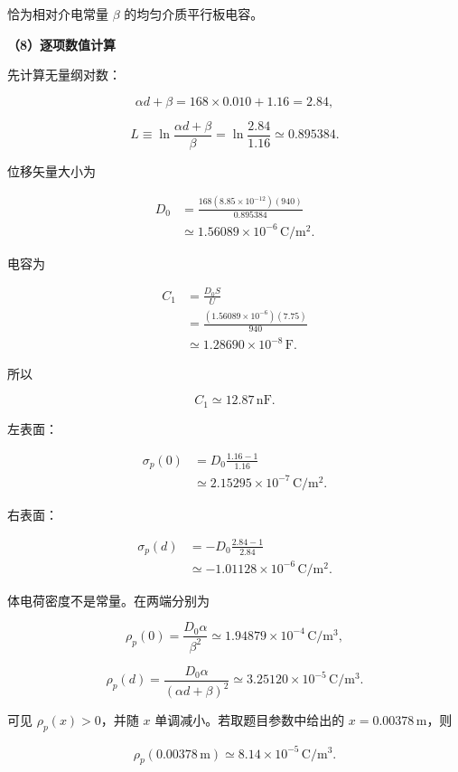 \documentclass[12pt,a4paper,UTF8]{ctexart}
\begin{document}
恰为相对介电常量 \(\beta\) 的均匀介质平行板电容。

\textbf{（8）逐项数值计算}

先计算无量纲对数：

\[
\alpha d+\beta
=168\times0.010+1.16
=2.84,
\]

\[
L\equiv
\ln\frac{\alpha d+\beta}{\beta}
=\ln\frac{2.84}{1.16}
\simeq0.895384.
\tag{13}
\]

位移矢量大小为

\[
\begin{aligned}
D_0
&=\frac{168(8.85\times10^{-12})(940)}
{0.895384}\\
&\simeq1.56089\times10^{-6}\,
\mathrm{C/m^2}.
\end{aligned}
\tag{14}
\]

电容为

\[
\begin{aligned}
C_1
&=\frac{D_0S}{U}\\
&=\frac{(1.56089\times10^{-6})(7.75)}{940}\\
&\simeq1.28690\times10^{-8}\,\mathrm F.
\end{aligned}
\]

所以

\[
\boxed{C_1\simeq12.87\,\mathrm{nF}}.
\tag{15}
\]

左表面：

\[
\begin{aligned}
\sigma_p(0)
&=D_0\frac{1.16-1}{1.16}\\
&\simeq2.15295\times10^{-7}\,
\mathrm{C/m^2}.
\end{aligned}
\tag{16}
\]

右表面：

\[
\begin{aligned}
\sigma_p(d)
&=-D_0\frac{2.84-1}{2.84}\\
&\simeq-1.01128\times10^{-6}\,
\mathrm{C/m^2}.
\end{aligned}
\tag{17}
\]

\begingroup
\samepage

体电荷密度不是常量。在两端分别为

\[
\rho_p(0)
=\frac{D_0\alpha}{\beta^2}
\simeq1.94879\times10^{-4}\,
\mathrm{C/m^3},
\tag{18}
\]

\[
\rho_p(d)
=\frac{D_0\alpha}{(\alpha d+\beta)^2}
\simeq3.25120\times10^{-5}\,
\mathrm{C/m^3}.
\tag{19}
\]

可见 \(\rho_p(x)>0\)，并随 \(x\) 单调减小。若取题目参数中给出的
\(x=0.00378\,\mathrm m\)，则

\[
\boxed{
\rho_p(0.00378\,\mathrm m)
\simeq8.14\times10^{-5}\,\mathrm{C/m^3}
}.
\tag{20}
\]
\end{document}
